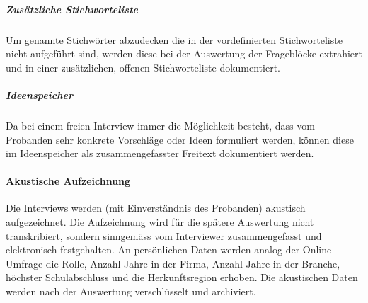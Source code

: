 \documentclass[../../main.tex]{subfiles}
\begin{document}
\subparagraph*{Zusätzliche Stichworteliste}\mbox{}

\begin{sloppypar}
Um genannte Stichwörter abzudecken die in der vordefinierten Stichworteliste nicht aufgeführt sind, werden diese bei der Auswertung der Frageblöcke extrahiert und in einer zusätzlichen, offenen Stichworteliste dokumentiert.
\end{sloppypar}

\subparagraph*{Ideenspeicher}\mbox{}

\begin{sloppypar}
Da bei einem freien Interview immer die Möglichkeit besteht, dass vom Probanden sehr konkrete Vorschläge oder Ideen formuliert werden, können diese im Ideenspeicher als zusammengefasster Freitext dokumentiert werden.
\end{sloppypar}

\paragraph*{Akustische Aufzeichnung}\mbox{}

\begin{sloppypar}
Die Interviews werden (mit Einverständnis des Probanden) akustisch aufgezeichnet. Die Aufzeichnung wird für die spätere Auswertung nicht transkribiert, sondern sinngemäss vom Interviewer zusammengefasst und elektronisch festgehalten. An persönlichen Daten werden analog der Online-Umfrage die Rolle, Anzahl Jahre in der Firma, Anzahl Jahre in der Branche, höchster Schulabschluss und die Herkunftsregion erhoben. Die akustischen Daten werden nach der Auswertung verschlüsselt und archiviert.
\end{sloppypar}
\end{document}

